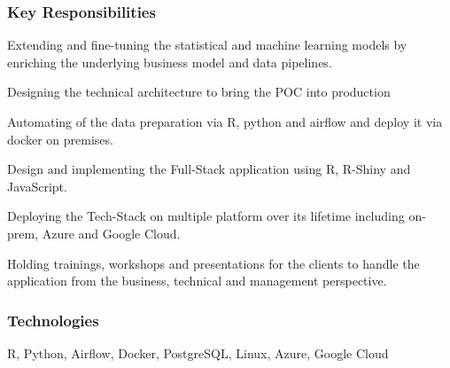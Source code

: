 \documentclass[letter,10pt]{article}
\begin{document}
\subsubsection*{{Key Responsibilities}}
\begin{zitemize} 
	\item Extending and fine-tuning the statistical and machine learning models by enriching the underlying business model and data pipelines. 
	\item Designing the technical architecture to bring the POC into production 
	\item Automating of the data preparation via R, python and airflow and deploy it via docker on premises. 
	\item Design and implementing the Full-Stack application using R, R-Shiny and JavaScript.     
	\item Deploying the Tech-Stack on multiple platform over its lifetime including on-prem, Azure and Google Cloud.
	\item Holding trainings, workshops and presentations for the clients to handle the application from the business, technical and management perspective. 

\end{zitemize}


\subsubsection*{{Technologies}}
R, Python, Airflow, Docker, PostgreSQL, Linux, Azure, Google Cloud
\end{document}
